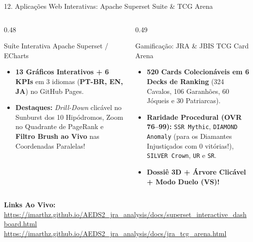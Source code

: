 \documentclass[aspectratio=169,10pt]{beamer}
\begin{document}
\begin{frame}{12. Aplicações Web Interativas: Apache Superset Suite \& TCG Arena}
\begin{columns}[T]
\begin{column}{0.48\textwidth}
\begin{block}{Suíte Interativa Apache Superset / ECharts}
\begin{itemize}
    \footnotesize
    \item \textbf{13 Gráficos Interativos + 6 KPIs} em 3 idiomas (\textbf{PT-BR, EN, JA}) no GitHub Pages.
    \item \textbf{Destaques:} \textit{Drill-Down} clicável no Sunburst dos 10 Hipódromos, Zoom no Quadrante de PageRank e \textbf{Filtro Brush ao Vivo} nas Coordenadas Paralelas!
\end{itemize}
\end{block}
\end{column}
\begin{column}{0.49\textwidth}
\begin{exampleblock}{Gamificação: JRA \& JBIS TCG Card Arena}
\begin{itemize}
    \footnotesize
    \item \textbf{520 Cards Colecionáveis em 6 Decks de Ranking} (324 Cavalos, 106 Garanhões, 60 Jóqueis e 30 Patriarcas).
    \item \textbf{Raridade Procedural (OVR 76--99):} \texttt{SSR Mythic}, \texttt{DIAMOND Anomaly} (para os Diamantes Injustiçados com 0 vitórias!), \texttt{SILVER Crown}, \texttt{UR} e \texttt{SR}.
    \item \textbf{Dossiê 3D + Árvore Clicável + Modo Duelo (VS)!}
\end{itemize}
\end{exampleblock}
\end{column}
\end{columns}
\vspace{2mm}
\centering
{\footnotesize \textbf{Links Ao Vivo:} \url{https://imarthz.github.io/AEDS2_jra_analysis/docs/superset_interactive_dashboard.html} \\ \url{https://imarthz.github.io/AEDS2_jra_analysis/docs/jra_tcg_arena.html}}
\end{frame}
\end{document}
